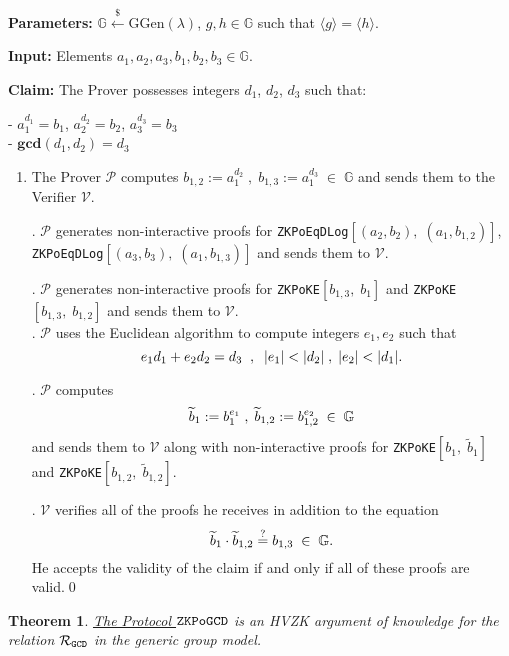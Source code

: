 \documentclass[11pt, lettersize, notitlepage, leqno, footskip=0.6cm]{article}
\newcommand{\bG}{\mathbb{G}}
\newcommand{\la}{\langle}
\newcommand{\ra}{\rangle}
\newcommand{\wti}{\widetilde}
\newcommand{\mc}{\mathcal}
\newcommand{\mb}{\mathbb}
\newcommand{\mbf}{\mathbf}
\newcommand{\mr}{\mathrm}
\newcommand{\lamb}{\lambda}
\newcommand{\mP}{\mc{P}}
\newcommand{\V}{\mc{V}}
\newcommand{\vs}{\vspace{-0.15cm}}
\newcommand{\noin}{\noindent}
\newcommand{\GCD}{\mbf{gcd}}
\newtheorem{Thm}{Theorem}[section]
\numberwithin{equation}{section}
\begin{document}
\noin \textbf{Parameters:} $\mb{G}\xleftarrow{\$} \mr{GGen}(\lamb)$,  $g,h\in \mb{G}$ such that $\la g \ra = \la h \ra$.

\noin \textbf{Input:} Elements $a_1, a_2, a_3, b_1, b_2, b_3 \in \mb{G}$.

\noin \textbf{Claim:} The Prover possesses integers $d_1$, $d_2$, $d_3$ such that:

\noin - $a_1^{d_1} = b_1$, $a_2^{d_2} = b_2$, $a_3^{d_3} = b_3$\\
\noin - $\GCD(d_1, d_2) = d_3$
 

\begin{enumerate}[wide, labelwidth=!, labelindent=0pt]\vs \item The Prover $\mc{P}$ computes $b_{1,2}:= a_1^{d_2}\;,\; b_{1,3}:= a_1^{d_3}\;\in\;\bG$ and sends them to the Verifier $\V$.

\noin 2. $\mP$ generates non-interactive proofs for \verb|ZKPoEqDLog|$[(a_2, b_2),\; (a_1, b_{1,2})]$, \verb|ZKPoEqDLog|$[(a_3, b_3),\; (a_1, b_{1,3})]$ and sends them to $\mc{V}$.

\noin 3. $\mc{P}$ generates non-interactive proofs for \verb|ZKPoKE|$[b_{1,3},\;b_1 ]$ and \verb|ZKPoKE|$[b_{1,3},\;b_{1,2} ]$ and sends them to $\V$.\\
\noin 3. $\mc{P}$ uses the Euclidean algorithm to compute integers $e_1, e_2$ such that \vs $$e_1d_1 + e_2d_2 = d_3\;\;,\;\; |e_1| < |d_2|\;,\; |e_2| < |d_1|. \vs $$

\noin 5. $\mc{P}$ computes $$\wti{b}_1:= b_1^{e_1}\;,\; \wti{b}_{1,2}:= b_{1,2}^{e_2}\;\in\;\bG \vs $$ and sends them to $\V$ along with non-interactive proofs for \verb|ZKPoKE|$[b_1,\; \wti{b}_1]$ and \verb|ZKPoKE|$[b_{1,2},\; \wti{b}_{1,2}]$.

\noin 6. $\mc{V}$ verifies all of the proofs he receives in addition to the equation \vs $$\wti{b}_1\cdot \wti{b}_{1,2}\stackrel{?}{=} b_{1,3}\;\in\;\bG. \vs $$ He accepts the validity of the claim if and only if all of these proofs are valid.\qed \end{enumerate}



\begin{Thm}\label{GCDProof} \hyperlink{GCD}{The Protocol $\tt{ZKPoGCD}$} is an HVZK argument of knowledge for the relation $\mc{R}_{{\tt{GCD}}}$ in the generic group model.\end{Thm}

\begin{prf} \end{prf}
\end{document}
